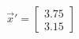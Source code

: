 \documentclass[preview]{standalone}
\begin{document}
\begin{align*}
\vec{x}' = \begin{bmatrix} 3.75 \\ 3.15 \end{bmatrix}
\end{align*}
\end{document}

